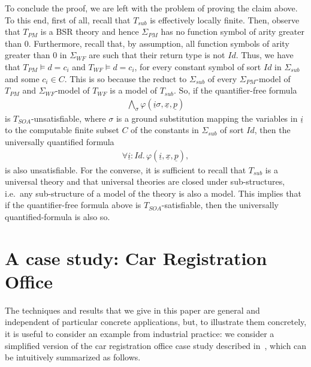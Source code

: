 \documentclass[conference]{IEEEtran}
\begin{document}
\begin{LONG}
\begin{IEEEproof}
  To conclude the proof, we are left with the problem of proving the
  claim above.  To this end, first of all, recall that $T_\mathit{sub}$ is
  effectively locally finite.  Then, observe that $T_\mathit{PM}$ is a BSR
  theory and hence $\Sigma_\mathit{PM}$ has no function symbol of arity
  greater than $0$.  Furthermore, recall that, by assumption, all
  function symbols of arity greater than $0$ in $\Sigma_\mathit{WF}$ are such
  that their return type is not $\mathit{Id}$.  Thus, we have that
  $T_\mathit{PM} \models d=c_i$ and $T_\mathit{WF} \models d=c_i$, for every
  constant symbol of sort $\mathit{Id}$ in $\Sigma_\mathit{sub}$ and some
  $c_i\in C$.  This is so because the reduct to $\Sigma_\mathit{sub}$ of
  every $\Sigma_\mathit{PM}$-model of $T_\mathit{PM}$ and $\Sigma_\mathit{WF}$-model of
  $T_\mathit{WF}$ is a model of $T_\mathit{sub}$.  So, if the quantifier-free formula
  \begin{eqnarray*}
    \bigwedge_{\sigma} 
     \varphi(\underline{i}\sigma,\underline{x},\underline{p}) 
  \end{eqnarray*}
  is $T_\mathit{SOA}$-unsatisfiable, where $\sigma$ is a ground substitution
  mapping the variables in $\underline{i}$ to the computable finite
  subset $C$ of the constants in $\Sigma_\mathit{sub}$ of sort
  $\mathit{Id}$, then the universally quantified formula
  \begin{eqnarray*}
    \forall \underline{i}:\mathit{Id}.\,
     \varphi(\underline{i},\underline{x},\underline{p}) ,
  \end{eqnarray*}
  is also unsatisfiable.  For the converse, it is sufficient to recall
  that $T_\mathit{sub}$ is a universal theory and that universal theories are
  closed under sub-structures, i.e.\ any sub-structure of a model of
  the theory is also a model.  This implies that if the
  quantifier-free formula above is $T_\mathit{SOA}$-satisfiable, then the
  universally quantified-formula is also so. 
\end{IEEEproof}

\section{A case study: Car Registration Office}
\label{subsec:running-ex}

The techniques and results that we give in this paper are general and independent of particular concrete applications, but, to illustrate them concretely, it is useful to consider an example from industrial practice: we consider a simplified version of the car registration office case study described in~\cite{avantssar-deliverable-5.1}, which can be intuitively summarized as follows.


\end{LONG}
\end{document}
